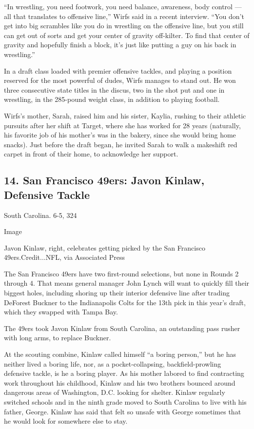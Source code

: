 ``In wrestling, you need footwork, you need balance, awareness, body
control --- all that translates to offensive line,'' Wirfs said in a
recent interview. ``You don't get into big scrambles like you do in
wrestling on the offensive line, but you still can get out of sorts and
get your center of gravity off-kilter. To find that center of gravity
and hopefully finish a block, it's just like putting a guy on his back
in wrestling.''

In a draft class loaded with premier offensive tackles, and playing a
position reserved for the most powerful of dudes, Wirfs manages to stand
out. He won three consecutive state titles in the discus, two in the
shot put and one in wrestling, in the 285-pound weight class, in
addition to playing football.

Wirfs's mother, Sarah, raised him and his sister, Kaylia, rushing to
their athletic pursuits after her shift at Target, where she has worked
for 28 years (naturally, his favorite job of his mother's was in the
bakery, since she would bring home snacks). Just before the draft began,
he invited Sarah to walk a makeshift red carpet in front of their home,
to acknowledge her support.

\hypertarget{14-san-francisco-49ers-javon-kinlaw-defensive-tackle}{%
\subsection{14. San Francisco 49ers: Javon Kinlaw, Defensive
Tackle}\label{14-san-francisco-49ers-javon-kinlaw-defensive-tackle}}

South Carolina. 6-5, 324

Image

Javon Kinlaw, right, celebrates getting picked by the San Francisco
49ers.Credit...NFL, via Associated Press

The San Francisco 49ers have two first-round selections, but none in
Rounds 2 through 4. That means general manager John Lynch will want to
quickly fill their biggest holes, including shoring up their interior
defensive line after trading DeForest Buckner to the Indianapolis Colts
for the 13th pick in this year's draft, which they swapped with Tampa
Bay.

The 49ers took Javon Kinlaw from South Carolina, an outstanding pass
rusher with long arms, to replace Buckner.

At the scouting combine, Kinlaw called himself ``a boring person,'' but
he has neither lived a boring life, nor, as a pocket-collapsing,
backfield-prowling defensive tackle, is he a boring player. As his
mother labored to find contracting work throughout his childhood, Kinlaw
and his two brothers bounced around dangerous areas of Washington, D.C.
looking for shelter. Kinlaw regularly switched schools and in the ninth
grade moved to South Carolina to live with his father, George. Kinlaw
has said that felt so unsafe with George sometimes that he would look
for somewhere else to stay.

